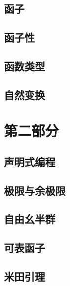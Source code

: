 \chapter{函子}\label{functors}


\chapter{函子性}\label{functoriality}


\chapter{函数类型}\label{function-types}


\chapter{自然变换}\label{natural-transformations}


\part*{第二部分}

\chapter{声明式编程}\label{declarative-programming}


\chapter{极限与余极限}\label{limits-and-colimits}


\chapter{自由幺半群}\label{free-monoids}


\chapter{可表函子}\label{representable-functors}


\chapter{米田引理}\label{the-yoneda-lemma}


